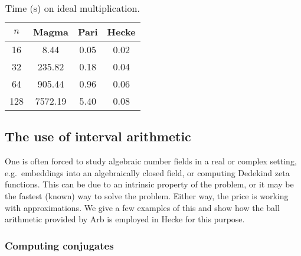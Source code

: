 \documentclass{sig-alternate-05-2015}
\begin{document}
\begin{table}
\center
\caption{Time (s) on ideal multiplication.}
\begin{small}
\setlength{\tabcolsep}{2.0pt}
\renewcommand{\arraystretch}{1.08}
\begin{tabular}{c c c c} \hline
$n$ & Magma & Pari & Hecke  \\ \hline
     16  &  8.44 & 0.05 & 0.02   \\
     32  &   235.82  &   0.18   &     0.04 \\
     64  &   905.44  &     0.96   &     0.06    \\
    128  &   7572.19   &     5.40    &       0.08 
\end{tabular}
\label{tab:ideals}
\end{small}
\end{table}


\subsection{The use of interval arithmetic}

One is often forced to study algebraic number fields in a real or complex setting, e.g.\ embeddings into an algebraically
closed field, or computing Dedekind zeta functions.
This can be due to an intrinsic property of the problem, or it may be the fastest (known)
 way to solve the problem. Either way, the price is working with approximations.
We give a few examples of this and show how the ball arithmetic provided by Arb is employed in Hecke for this purpose.

\subsubsection{Computing conjugates}\label{subsub:conj}
\end{document}
